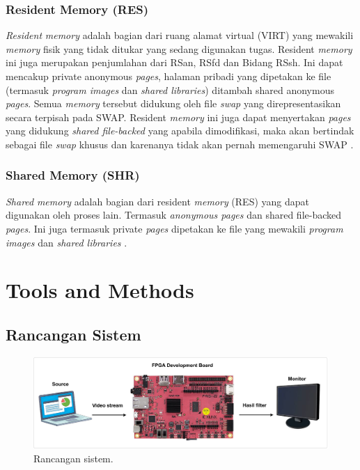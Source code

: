 
\subsubsection{Resident Memory (RES)}

\textit{Resident} \textit{memory} adalah bagian dari ruang alamat virtual (VIRT) yang mewakili \textit{memory} fisik yang tidak ditukar yang sedang digunakan tugas. Resident \textit{memory} ini juga merupakan penjumlahan dari RSan, RSfd dan Bidang RSsh. Ini dapat mencakup private anonymous \textit{pages}, halaman pribadi yang dipetakan ke file (termasuk
\textit{program images} dan \textit{shared libraries}) ditambah shared anonymous \textit{pages}. Semua \textit{memory} tersebut didukung oleh file \textit{swap} yang direpresentasikan secara terpisah pada SWAP. Resident \textit{memory} ini juga dapat menyertakan \textit{pages} yang didukung \textit{shared file-backed} yang apabila dimodifikasi, maka akan bertindak sebagai file \textit{swap} khusus dan karenanya tidak akan pernah memengaruhi SWAP \cite{manual:linux}.

\subsubsection{Shared Memory (SHR)}

\textit{Shared} \textit{memory} adalah bagian dari resident \textit{memory} (RES) yang dapat digunakan oleh proses lain. Termasuk \textit{anonymous pages} dan shared file-backed \textit{pages}. Ini juga termasuk private \textit{pages} dipetakan ke file yang mewakili \textit{program images} dan \textit{shared libraries} \cite{manual:linux}. 




\section{Tools and Methods}

\subsection{Rancangan Sistem}
\begin{figure}[ht]
    \includegraphics[width=1\linewidth, center]{images/rancangan-sistem2.png}
    \caption{Rancangan sistem.}
    \label{fig:rancangan-sistem}
\end{figure}

